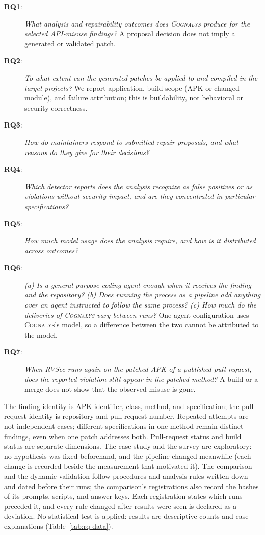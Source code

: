 \documentclass[conference]{IEEEtran}
\newcommand{\system}{\textsc{Cognalys}}
\newcommand{\researchq}[1]{\textbf{RQ#1}}
\begin{document}
\begin{description}
  \item[\researchq{1}:] \emph{What analysis and repairability outcomes does
  {\system} produce for the selected API-misuse findings?}
  A proposal decision does not imply a generated or validated patch.

\item[\researchq{2}:] \emph{To what extent can the generated patches be
  applied to and compiled in the target projects?}
  We report application, build scope (APK or changed module), and failure
  attribution; this is buildability, not behavioral or security correctness.

  \item[\researchq{3}:] \emph{How do maintainers respond to submitted repair
  proposals, and what reasons do they give for their decisions?}

  \item[\researchq{4}:] \emph{Which detector reports does the analysis
  recognize as false positives or as violations without security impact,
  and are they concentrated in particular specifications?}

  \item[\researchq{5}:] \emph{How much model usage does the analysis
  require, and how is it distributed across outcomes?}

\item[\researchq{6}:] \emph{(a) Is a general-purpose coding agent enough when
  it receives the finding and the repository? (b) Does running the process as a
  pipeline add anything over an agent instructed to follow the same process?
  (c) How much do the deliveries of {\system} vary between runs?}
  One agent configuration uses {\system}'s model, so a difference between the
  two cannot be attributed to the model.

  \item[\researchq{7}:] \emph{When RVSec runs again on the patched APK of a
  published pull request, does the reported violation still appear in the
  patched method?}
  A build or a merge does not show that the observed misuse is gone.
\end{description}

The finding identity is APK identifier, class, method, and specification; the
pull-request identity is repository and pull-request number. Repeated attempts are not independent
cases; different specifications in one method remain distinct findings, even
when one patch addresses both. Pull-request status and build status are separate
dimensions. The case study and the survey are exploratory: no hypothesis was
fixed beforehand, and the pipeline changed meanwhile (each change is recorded
beside the measurement that motivated it). The comparison and the dynamic
validation follow procedures and analysis rules written down and dated
before their runs; the comparison's registrations also record the hashes of
its prompts, scripts, and answer keys. Each registration states which runs
preceded it, and every rule changed after results were seen is declared as a
deviation. No statistical test is applied: results are descriptive counts and
case explanations (Table~\ref{tab:rq-data}).
\end{document}
